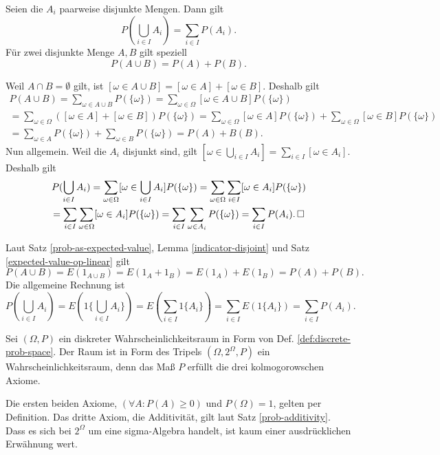 \newpage
\begin{Satz}%
\label{prob-additivity}\newlinefirst
Seien die $A_i$ paarweise disjunkte Mengen. Dann gilt
\[P(\bigcup_{i\in I} A_i) = \sum_{i\in I} P(A_i).\]
Für zwei disjunkte Menge $A,B$ gilt speziell
\[P(A\cup B) = P(A) + P(B).\]
\end{Satz}

\begin{Beweis}[Beweis 1]
Weil $A\cap B=\emptyset$ gilt, ist $[\omega\in A\cup B]
= [\omega\in A]+[\omega\in B]$. Deshalb gilt
\begin{gather*}
P(A\cup B) = \sum_{\omega\in A\cup B} P(\{\omega\})
= \sum_{\omega\in\Omega} [\omega\in A\cup B] P(\{\omega\})\\
= \sum_{\omega\in\Omega} ([\omega\in A]+[\omega\in B]) P(\{\omega\})
= \sum_{\omega\in\Omega} [\omega\in A]P(\{\omega\})
+ \sum_{\omega\in\Omega} [\omega\in B]P(\{\omega\})\\
= \sum_{\omega\in A} P(\{\omega\}) + \sum_{\omega\in B} P(\{\omega\})
= P(A)+B(B).
\end{gather*}
Nun allgemein. Weil die $A_i$ disjunkt sind, gilt
$[\omega\in\bigcup_{i\in I} A_i] = \sum_{i\in I} [\omega\in A_i]$. Deshalb gilt
\begin{gather*}
P(\bigcup_{i\in I} A_i)
= \sum_{\omega\in\Omega}[\omega\in\bigcup_{i\in I} A_i]P(\{\omega\})
= \sum_{\omega\in\Omega}\sum_{i\in I}[\omega\in A_i]P(\{\omega\})\\
= \sum_{i\in I}\sum_{\omega\in\Omega}[\omega\in A_i]P(\{\omega\})
= \sum_{i\in I}\sum_{\omega\in A_i}P(\{\omega\})
= \sum_{i\in I}P(A_i).\,\square
\end{gather*}
\end{Beweis}
\begin{Beweis}[Beweis 2]
Laut Satz \ref{prob-as-expected-value},
Lemma \ref{indicator-disjoint}
und Satz \ref{expected-value-op-linear} gilt
\[P(A\cup B) = E(1_{A\cup B}) = E(1_A+1_B) = E(1_A) + E(1_B)
= P(A) + P(B).\]
Die allgemeine Rechnung ist
\[P(\bigcup_{i\in I} A_i) = E(1\{\bigcup_{i\in I} A_i\})
= E(\sum_{i\in I} 1\{A_i\})
= \sum_{i\in I} E(1\{A_i\}) = \sum_{i\in I} P(A_i).\]
\end{Beweis}

\begin{Satz}
Sei $(\Omega,P)$ ein diskreter Wahrscheinlichkeitsraum in Form von Def.
\ref{def:discrete-prob-space}. Der Raum ist in Form des Tripels
$(\Omega,2^\Omega,P)$ ein Wahrscheinlichkeitsraum, denn das Maß
$P$ erfüllt die drei kolmogorowschen Axiome.
\end{Satz}
\begin{Beweis}
Die ersten beiden Axiome, $(\forall A\colon P(A)\ge 0)$ und
$P(\Omega)=1$, gelten per Definition. Das dritte Axiom, die Additivität,
gilt laut Satz \ref{prob-additivity}. Dass es sich bei $2^\Omega$
um eine sigma-Algebra handelt, ist kaum einer ausdrücklichen
Erwähnung wert.\,\qedsymbol
\end{Beweis}

